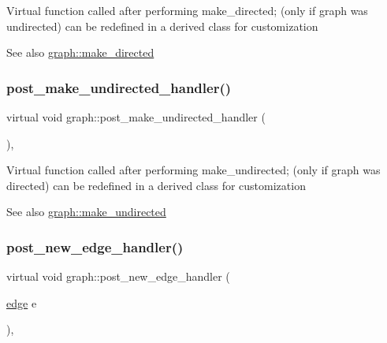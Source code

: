 Virtual function called after performing make\+\_\+directed; (only if graph was undirected) can be redefined in a derived class for customization

\begin{DoxySeeAlso}{See also}
\mbox{\hyperlink{classgraph_a1615678dee6248d6d8a00c553770b3bd}{graph\+::make\+\_\+directed}} 
\end{DoxySeeAlso}
\mbox{\label{classgraph_a3d2bc348d12931aff1d2e97a6b4285c3}} 
\subsubsection{\texorpdfstring{post\+\_\+make\+\_\+undirected\+\_\+handler()}{post\_make\_undirected\_handler()}}
{\footnotesize\ttfamily virtual void graph\+::post\+\_\+make\+\_\+undirected\+\_\+handler (\begin{DoxyParamCaption}{ }\end{DoxyParamCaption})\hspace{0.3cm}{\ttfamily [inline]}, {\ttfamily [virtual]}}

Virtual function called after performing make\+\_\+undirected; (only if graph was directed) can be redefined in a derived class for customization

\begin{DoxySeeAlso}{See also}
\mbox{\hyperlink{classgraph_a31c8b895bd842f1b9dcc67649956cfc7}{graph\+::make\+\_\+undirected}} 
\end{DoxySeeAlso}
\mbox{\label{classgraph_a88f098d412bcbacba975e70be8d1a892}} 
\subsubsection{\texorpdfstring{post\+\_\+new\+\_\+edge\+\_\+handler()}{post\_new\_edge\_handler()}}
{\footnotesize\ttfamily virtual void graph\+::post\+\_\+new\+\_\+edge\+\_\+handler (\begin{DoxyParamCaption}\item[{\mbox{\hyperlink{classedge}{edge}}}]{e }\end{DoxyParamCaption})\hspace{0.3cm}{\ttfamily [inline]}, {\ttfamily [virtual]}}

